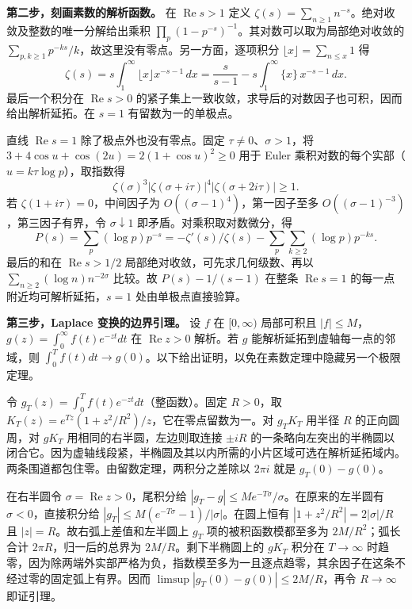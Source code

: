 \documentclass[11pt,a4paper]{article}
\begin{document}
\textbf{第二步，刻画素数的解析函数。} 在 \(\operatorname{Re}s>1\) 定义 \(\zeta(s)=\sum_{n\ge1}n^{-s}\)。绝对收敛及整数的唯一分解给出乘积 \(\prod_p(1-p^{-s})^{-1}\)。其对数可以取为局部绝对收敛的 \(\sum_{p,k\ge1}p^{-ks}/k\)，故这里没有零点。另一方面，逐项积分 \(\lfloor x\rfloor=\sum_{n\le x}1\) 得 \[
 \zeta(s)=s\int_1^\infty\lfloor x\rfloor x^{-s-1}\,dx
 =\frac{s}{s-1}-s\int_1^\infty\{x\}\,x^{-s-1}\,dx .
\] 最后一个积分在 \(\operatorname{Re}s>0\) 的紧子集上一致收敛，求导后的对数因子也可积，因而给出解析延拓。在 \(s=1\) 有留数为一的单极点。

直线 \(\operatorname{Re}s=1\) 除了极点外也没有零点。固定 \(\tau\ne0\)、\(\sigma>1\)，将 \(3+4\cos u+\cos(2u)=2(1+\cos u)^2\ge0\) 用于 Euler 乘积对数的每个实部（\(u=k\tau\log p\)），取指数得 \[
 \zeta(\sigma)^3|\zeta(\sigma+i\tau)|^4|\zeta(\sigma+2i\tau)|\ge1 .
\] 若 \(\zeta(1+i\tau)=0\)，中间因子为 \(O((\sigma-1)^4)\)，第一因子至多 \(O((\sigma-1)^{-3})\)，第三因子有界，令 \(\sigma\downarrow1\) 即矛盾。对乘积取对数微分，得 \[
 P(s)=\sum_p(\log p)p^{-s}
 =-\zeta'(s)/\zeta(s)-\sum_p\sum_{k\ge2}(\log p)p^{-ks}.
\] 最后的和在 \(\operatorname{Re}s>1/2\) 局部绝对收敛，可先求几何级数、再以 \(\sum_{n\ge2}(\log n)n^{-2\sigma}\) 比较。故 \(P(s)-1/(s-1)\) 在整条 \(\operatorname{Re}s=1\) 的每一点附近均可解析延拓，\(s=1\) 处由单极点直接验算。

\textbf{第三步，Laplace 变换的边界引理。} 设 \(f\) 在 \([0,\infty)\) 局部可积且 \(|f|\le M\)，\(g(z)=\int_0^\infty f(t)e^{-zt}dt\) 在 \(\operatorname{Re}z>0\) 解析。若 \(g\) 能解析延拓到虚轴每一点的邻域，则 \(\int_0^T f(t)dt\to g(0)\)。以下给出证明，以免在素数定理中隐藏另一个极限定理。

令 \(g_T(z)=\int_0^Tf(t)e^{-zt}dt\)（整函数）。固定 \(R>0\)，取 \(K_T(z)=e^{Tz}(1+z^2/R^2)/z\)，它在零点留数为一。对 \(g_TK_T\) 用半径 \(R\) 的正向圆周，对 \(gK_T\) 用相同的右半圆，左边则取连接 \(\pm iR\) 的一条略向左突出的半椭圆以闭合它。因为虚轴线段紧，半椭圆及其以内所需的小片区域可选在解析延拓域内。两条围道都包住零。由留数定理，两积分之差除以 \(2\pi i\) 就是 \(g_T(0)-g(0)\)。

在右半圆令 \(\sigma=\operatorname{Re}z>0\)，尾积分给 \(|g_T-g|\le Me^{-T\sigma}/\sigma\)。在原来的左半圆有 \(\sigma<0\)，直接积分给 \(|g_T|\le M(e^{-T\sigma}-1)/|\sigma|\)。在圆上恒有 \(|1+z^2/R^2|=2|\sigma|/R\) 且 \(|z|=R\)。故右弧上差值和左半圆上 \(g_T\) 项的被积函数模都至多为 \(2M/R^2\)；弧长合计 \(2\pi R\)，归一后的总界为 \(2M/R\)。剩下半椭圆上的 \(gK_T\) 积分在 \(T\to\infty\) 时趋零，因为除两端外实部严格为负，指数模至多为一且逐点趋零，其余因子在这条不经过零的固定弧上有界。因而 \(\limsup|g_T(0)-g(0)|\le2M/R\)，再令 \(R\to\infty\) 即证引理。
\end{document}
